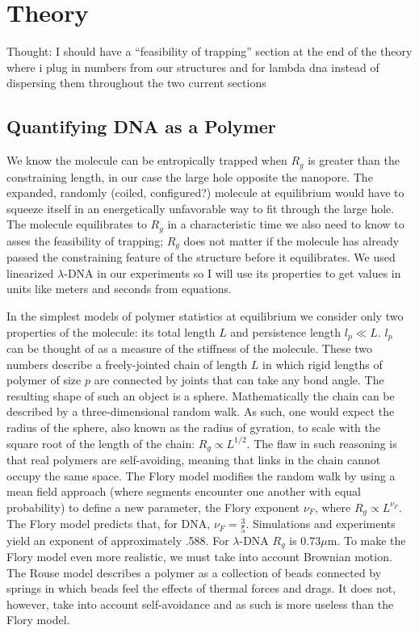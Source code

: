 \documentclass[aps,prl,preprint,groupedaddress]{revtex4}
\begin{document}
\section{Theory}

Thought: I should have a ``feasibility of trapping'' section at the end of the theory where i plug in numbers from our structures and for lambda dna instead of dispersing them throughout the two current sections

\subsection{Quantifying DNA as a Polymer}

We know the molecule can be entropically trapped when \(R_g\) is greater than the constraining length, in our case the large hole opposite the nanopore.
The expanded, randomly (coiled, configured?) molecule at equilibrium would have to squeeze itself in an energetically unfavorable way to fit through the large hole.\cite{trapping}
The molecule equilibrates to \(R_g\) in a characteristic time we also need to know to asses the feasibility of trapping;
\(R_g\) does not matter if the molecule has already passed the constraining feature of the structure before it equilibrates.
We used linearized \(\lambda\)-DNA in our experiments so I will use its properties to get values in units like meters and seconds from equations.

In the simplest models of polymer statistics at equilibrium we consider only two properties of the molecule: its total length \(L\) and persistence length \(l_p \ll L\).
\(l_p\) can be thought of as a measure of the stiffness of the molecule.
These two numbers describe a freely-jointed chain of length \(L\) in which rigid lengths of polymer of size \(p\) are connected by joints that can take any bond angle.
The resulting shape of such an object is a sphere.
Mathematically the chain can be described by a three-dimensional random walk.
As such, one would expect the radius of the sphere, also known as the radius of gyration, to scale with the square root of the length of the chain: \(R_g \propto L^{1/2}\).
The flaw in such reasoning is that real polymers are self-avoiding, meaning that links in the chain cannot occupy the same space.
The Flory model modifies the random walk by using a mean field approach (where segments encounter one another with equal probability) to define a new parameter, the Flory exponent \(\nu_F\), where \(R_g \propto L^{\nu_F}\).
The Flory model predicts that, for DNA, \(\nu_F = \frac{3}{5}\).
Simulations and experiments yield an exponent of approximately .588.\cite{exponent}
For \(\lambda\)-DNA \(R_g\) is \(0.73\mu\)m.
To make the Flory model even more realistic, we must take into account Brownian motion.
The Rouse model describes a polymer as a collection of beads connected by springs in which beads feel the effects of thermal forces and drags.
It does not, however, take into account self-avoidance and as such is more useless than the Flory model. 
\end{document}
